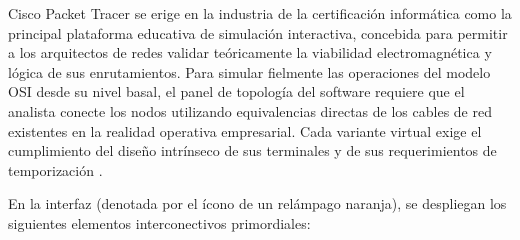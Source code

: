 \documentclass[a4paper,12pt]{article}
\begin{document}
Cisco Packet Tracer se erige en la industria de la certificación informática como la principal plataforma educativa de simulación interactiva, concebida para permitir a los arquitectos de redes validar teóricamente la viabilidad electromagnética y lógica de sus enrutamientos. Para simular fielmente las operaciones del modelo OSI desde su nivel basal, el panel de topología del software requiere que el analista conecte los nodos utilizando equivalencias directas de los cables de red existentes en la realidad operativa empresarial. Cada variante virtual exige el cumplimiento del diseño intrínseco de sus terminales y de sus requerimientos de temporización \cite{packet_tracer_cables_guide}. 

En la interfaz (denotada por el ícono de un relámpago naranja), se despliegan los siguientes elementos interconectivos primordiales:
\end{document}
